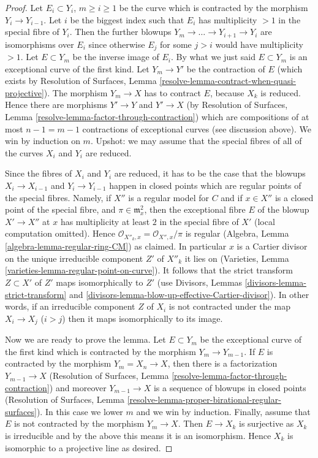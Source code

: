 \documentclass{stacks-project}
\theoremstyle{plain}
\theoremstyle{definition}
\theoremstyle{remark}
\numberwithin{equation}{subsection}
\begin{document}
\begin{proof}
\medskip\noindent
Let $E_i \subset Y_i$, $m \geq i \geq 1$ be the curve which is contracted
by the morphism $Y_i \to Y_{i - 1}$. Let $i$ be the biggest index such
that $E_i$ has multiplicity $> 1$ in the special fibre of $Y_i$.
Then the further blowups $Y_m \to \ldots \to Y_{i + 1} \to Y_i$
are isomorphisms over $E_i$ since otherwise $E_j$ for some $j > i$
would have multiplicity $> 1$. Let $E \subset Y_m$ be the inverse
image of $E_i$. By what we just said $E \subset Y_m$ is an
exceptional curve of the first kind. Let $Y_m \to Y'$ be the
contraction of $E$ (which exists by Resolution of Surfaces, Lemma
\ref{resolve-lemma-contract-when-quasi-projective}). The morphism
$Y_m \to X$ has to contract $E$, because $X_k$ is reduced.
Hence there are morphisms $Y' \to Y$ and $Y' \to X$ (by
Resolution of Surfaces, Lemma
\ref{resolve-lemma-factor-through-contraction})
which are compositions of at most $n - 1 = m - 1$ contractions
of exceptional curves (see discussion above). We win by induction on $m$.
Upshot: we may assume that the special fibres of all of
the curves $X_i$ and $Y_i$ are reduced.

\medskip\noindent
Since the fibres of $X_i$ and $Y_i$ are reduced, it has to be the
case that the blowups $X_i \to X_{i - 1}$ and $Y_i \to Y_{i - 1}$
happen in closed points which are regular points of the special fibres.
Namely, if $X''$ is a regular model for $C$ and if $x \in X''$
is a closed point of the special fibre, and
$\pi \in \mathfrak m_x^2$, then the exceptional fibre $E$ of the
blowup $X' \to X''$ at $x$ has multiplicity at least $2$ in the
special fibre of $X'$ (local computation omitted).
Hence $\mathcal{O}_{X''_k, x} = \mathcal{O}_{X'', x}/\pi$ is
regular (Algebra, Lemma \ref{algebra-lemma-regular-ring-CM}) as claimed.
In particular $x$ is a Cartier divisor on the unique
irreducible component $Z'$ of $X''_k$ it lies on
(Varieties, Lemma \ref{varieties-lemma-regular-point-on-curve}).
It follows that the strict transform $Z \subset X'$ of $Z'$
maps isomorphically to $Z'$
(use Divisors, Lemmas \ref{divisors-lemma-strict-transform} and
\ref{divisors-lemma-blow-up-effective-Cartier-divisor}).
In other words, if an irreducible component $Z$ of $X_i$
is not contracted under the map $X_i \to X_j$ ($i > j$)
then it maps isomorphically to its image.

\medskip\noindent
Now we are ready to prove the lemma.
Let $E \subset Y_m$ be the exceptional curve of the first kind
which is contracted by the morphism $Y_m \to Y_{m - 1}$. If $E$ is
contracted by the morphism $Y_m = X_n \to X$, then there is a factorization
$Y_{m - 1} \to X$ (Resolution of Surfaces, Lemma
\ref{resolve-lemma-factor-through-contraction})
and moreover $Y_{m - 1} \to X$ is a sequence of blowups
in closed points (Resolution of Surfaces, Lemma
\ref{resolve-lemma-proper-birational-regular-surfaces}).
In this case we lower $m$ and we win by induction.
Finally, assume that $E$ is not contracted by the morphism $Y_m \to X$.
Then $E \to X_k$ is surjective as $X_k$ is irreducible
and by the above this means it is an isomorphism.
Hence $X_k$ is isomorphic to a projective line as desired.
\end{proof}
\end{document}

